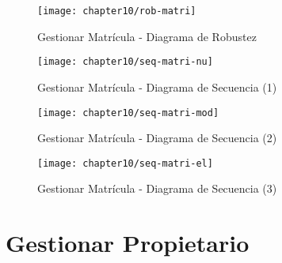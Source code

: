\begin{landscape}
    \begin{figure}[H]
        \centering
        \texttt{[image: chapter10/rob-matri]}
        \caption{Gestionar Matrícula - Diagrama de Robustez}
        \label{fig:rob-matri}
    \end{figure}
    \begin{figure}[H]
        \centering
        \texttt{[image: chapter10/seq-matri-nu]}
        \caption{Gestionar Matrícula - Diagrama de Secuencia (1) }
        \label{fig:seq-matri-nu}
    \end{figure}
    
    \begin{figure}[H]
        \centering
        \texttt{[image: chapter10/seq-matri-mod]}
        \caption{Gestionar Matrícula - Diagrama de Secuencia (2) }
        \label{fig:seq-matri-mo}
    \end{figure}
    
    \begin{figure}[H]
        \centering
        \texttt{[image: chapter10/seq-matri-el]}
        \caption{Gestionar Matrícula - Diagrama de Secuencia (3) }
        \label{fig:seq-matri-el}
    \end{figure}
\end{landscape}
    
\section{Gestionar Propietario}

